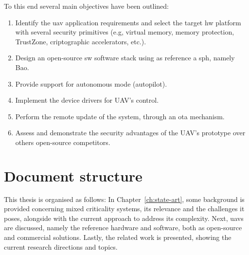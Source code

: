 To this end several main objectives have been outlined:
\begin{enumerate}
\item Identify the \gls{uav} application requirements and select the target
  \gls{hw} platform with several security primitives
  (e.g, virtual memory, memory protection, TrustZone, criptographic
  accelerators, etc.).
\item Design an open-source \gls{sw} software stack using as reference a
  \gls{sph}, namely Bao.
\item Provide support for autonomous mode (autopilot).
\item Implement the device drivers for UAV's control.
\item Perform the remote update of the system, through an \gls{ota} mechanism.
\item Assess and demonstrate the security advantages of the UAV's prototype over
  others open-source competitors.
\end{enumerate}

\section{Document structure}
This thesis is organised as follows:
In Chapter~\ref{ch:state-art}, some background is provided concerning mixed criticality
systems, its relevance and the challenges it poses, alongside with the current
approach to address its complexity.
Next, \glspl{uav} are discussed,
namely the reference hardware and software, both as open-source and commercial
solutions. Lastly, the related work is
presented, showing the current research directions and topics.%

